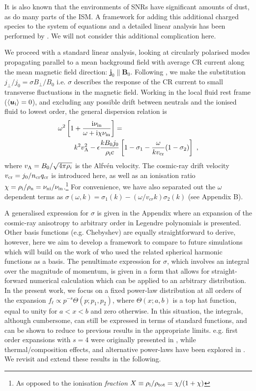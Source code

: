 \documentclass[a4paper,fleqn,usenatbib]{mnras}
\begin{document}
It is also known that the environments of SNRs have significant amounts of dust, as do many parts of the ISM. A framework for adding this additional charged species to the system of equations and a detailed linear analysis has been performed by \cite{squire}. We will not consider this additional complication here. 



We proceed with a standard linear analysis, looking at circularly polarised modes propagating parallel to a mean background field {with average CR current along the mean magnetic field direction: $\bm{j}_0 \| \bm{B}_0$}. Following \cite{Bell04}, we make the substitution $j_\bot/j_0 = \sigma  B_\bot/B_0$
i.e. $\sigma$ describes the response of the CR current to small transverse fluctuations in the magnetic field. 
Working in the local fluid rest frame ($\langle \bm{u}_{\rm i}\rangle = 0$), and excluding any possible drift between neutrals and the ionised fluid to lowest order, the general dispersion relation is
\begin{align}
\label{DispMaster}
&\omega^2 \left[1+\frac{{\rm i} \nu_{\rm in}}{\omega+{\rm i}\chi  \nu_{\rm in}}
\right]=\nonumber\\ 
& ~~~~~~~
k^2 v_{\rm A}^2 - \epsilon\frac{kB_0 j_0}{\rho_{\rm i} c}\left[1-\sigma_1 - \frac{\omega}{k v_{\rm cr}}(1-\sigma_2)\right] ~,
\end{align}
where $v_{\rm A}= B_0/\sqrt{4 \pi \rho_i}$ is the Alfv\'en velocity. The cosmic-ray drift velocity $v_{\rm cr} = j_0/n_{\rm cr} q_{\rm cr} $ is introduced here, as well as an ionisation ratio $\chi={\rho_{\rm i}}/{\rho_{\rm n}}=\nu_{\rm ni}/\nu_{\rm in}$.\footnote{
As opposed to the ionisation \emph{fraction} $X \equiv\rho_{\rm i}/\rho_{\rm tot} = \chi/(1+\chi)$} 
For convenience, we have also separated out the $\omega$ dependent terms as $\sigma(\omega, k) = \sigma_1(k) -(\omega/v_{cr} k) \sigma_2(k)$ (see Appendix B). 

A generalised expression for $\sigma$ is given in the Appendix where an expansion of the cosmic-ray anisotropy to arbitrary order in Legendre polynomials is presented. Other basis functions (e.g. Chebyshev) are equally straightforward to derive, however, here we aim to develop a framework to compare to future simulations which will build on the work of \citet{Reville13} who used the related spherical harmonic functions as a basis. The penultimate expression for $\sigma$, which involves an integral over the magnitude of momentum, is given in a form that allows for straight-forward numerical calculation which can be applied to an arbitrary distribution. In the present work, we focus on a fixed power-law distribution at all orders of the expansion $f_\ell \propto p^{-s}\Theta(p;p_1,p_2)$, where $\Theta(x;a,b)$ is a top hat function, equal to unity for $a<x<b$ and zero otherwise. In this situation, the integrals, although cumbersome, can still be expressed in terms of standard functions, and can be shown to reduce to previous results in the appropriate limits.  e.g. first order expansions with $s=4$ were originally presented  in \cite{Bell04}, while thermal/composition effects, and alternative power-laws have been explored in \cite{Reville07}. We revisit and extend these results in the following.
\end{document}
